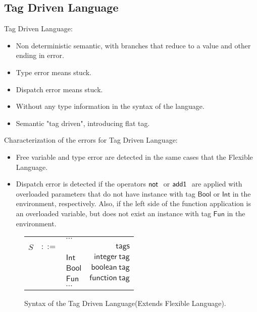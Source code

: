 \documentclass[preprint,authoryear,sort&compress,9pt,nocopyrightspace]{article}
\newcommand{\negacion}[1]{\mathsf{not} \ #1}
\newcommand{\suma}[1]{\mathsf{add1} \ #1}
\newcommand{\boolt}{\mathsf{Bool}}
\newcommand{\intt}{\mathsf{Int}}
\newcommand{\funt}{\mathsf{Fun}}
\newcommand{\semanticA}{Flexible Language}
\newcommand{\semanticB}{Tag Driven Language}
\begin{document}
\subsection{\semanticB}
\semanticB:
\begin{itemize}\item Non deterministic semantic, with branches that reduce to a value and other ending in error.
\item Type error means stuck.
\item Dispatch error means stuck.
\item Without any type information in the syntax of the language.
\item Semantic "tag driven", introducing flat tag.
\end{itemize}
Characterization of the errors for \semanticB:
\begin{itemize}
\item Free variable and type error are detected in the same cases that the \semanticA.
\item Dispatch error is detected  if the operators $\negacion$ or $\suma$ are applied with overloaded parameters that do not have instance with tag $\boolt$ or $\intt$ in the environment, respectively. Also, if the left side of the function application is an overloaded variable, but does not exist an instance with tag $\funt$ in the environment.
\end{itemize}


\begin{figure}[]
\begin{small}
\begin{center}
\begin{tabular}{|l c l r|}
\hline
&&$\cdots$&\\
$S$&$::=$&&$\mathsf {tags}$\\
&&$\intt$&$\mathsf {integer \ tag}$\\
&&$\boolt$&$\mathsf {boolean \ tag}$\\
&&$\funt$&$\mathsf {function \ tag}$\\
&&$\cdots$&\\
\hline
\end{tabular}
\caption{Syntax of the \semanticB(Extends \semanticA).}
\label{figure:sencilla}
\end{center}
\end{small}
\end{figure}
\end{document}
